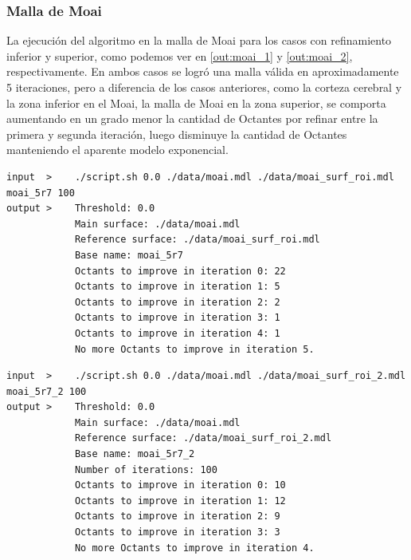 \subsubsection{Malla de Moai}

La ejecución del algoritmo en la malla de Moai para los casos con refinamiento inferior y superior, como podemos ver en \autoref{out:moai_1} y \autoref{out:moai_2}, respectivamente. En ambos casos se logró una malla válida en aproximadamente 5 iteraciones, pero a diferencia de los casos anteriores, como la corteza cerebral y la zona inferior en el Moai, la malla de Moai en la zona superior, se comporta aumentando en un grado menor la cantidad de Octantes por refinar entre la primera y segunda iteración, luego disminuye la cantidad de Octantes manteniendo el aparente modelo exponencial.

\begin{lstlisting}[style=Console,caption={Output de ejecución algoritmo propuesto en malla de Moai con zona a refinar en zona inferior.\\ Fuente: Elaboración propia.},label={out:moai_1},float,floatplacement=H]
input  >    ./script.sh 0.0 ./data/moai.mdl ./data/moai_surf_roi.mdl moai_5r7 100
output >    Threshold: 0.0
            Main surface: ./data/moai.mdl
            Reference surface: ./data/moai_surf_roi.mdl
            Base name: moai_5r7
            Octants to improve in iteration 0: 22
            Octants to improve in iteration 1: 5
            Octants to improve in iteration 2: 2
            Octants to improve in iteration 3: 1
            Octants to improve in iteration 4: 1
            No more Octants to improve in iteration 5.
\end{lstlisting}


\begin{lstlisting}[style=Console,caption={Output de ejecución algoritmo propuesto en malla de Moai con zona a refinar en zona superior.\\ Fuente: Elaboración propia.},label={out:moai_2}, float,floatplacement=H]
input  >    ./script.sh 0.0 ./data/moai.mdl ./data/moai_surf_roi_2.mdl moai_5r7_2 100
output >    Threshold: 0.0
            Main surface: ./data/moai.mdl
            Reference surface: ./data/moai_surf_roi_2.mdl
            Base name: moai_5r7_2
            Number of iterations: 100
            Octants to improve in iteration 0: 10
            Octants to improve in iteration 1: 12
            Octants to improve in iteration 2: 9
            Octants to improve in iteration 3: 3
            No more Octants to improve in iteration 4.
\end{lstlisting}


